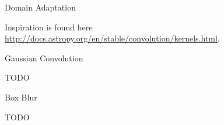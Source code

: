 \chap Domain Adaptation

Inspiration is found here
\url{http://docs.astropy.org/en/stable/convolution/kernels.html}.

\sec Gaussian Convolution

TODO

\sec Box Blur

TODO
